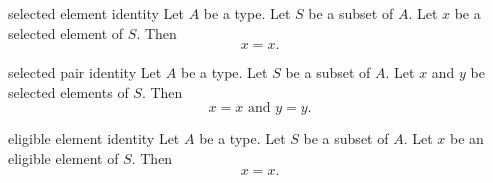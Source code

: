 \begin{cleanresult}{selected element identity}
Let $A$ be a type.
Let $S$ be a subset of $A$.
Let $x$ be a selected element of $S$.
Then \[x = x.\]
\end{cleanresult}

\begin{cleanresult}{selected pair identity}
Let $A$ be a type.
Let $S$ be a subset of $A$.
Let $x$ and $y$ be selected elements of $S$.
Then \[x = x \text{ and } y = y.\]
\end{cleanresult}

\begin{cleanresult}{eligible element identity}
Let $A$ be a type.
Let $S$ be a subset of $A$.
Let $x$ be an eligible element of $S$.
Then \[x = x.\]
\end{cleanresult}

